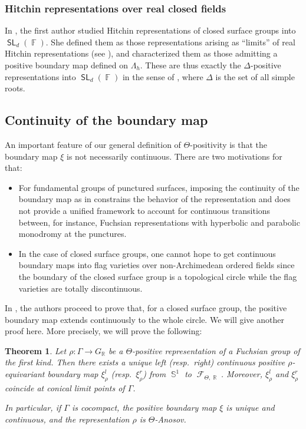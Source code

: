 \documentclass{amsart}
\theoremstyle{plain}
\newtheorem{ThmIntro}{Theorem}
\theoremstyle{definition}
\DeclareMathOperator{\SL}{\mathsf{SL}}
\DeclareMathOperator{\Fc}{\mathcal{F}}
\DeclareMathOperator{\Fb}{{\mathbb{F}}}
\DeclareMathOperator{\Rb}{{\mathbb{R}}}
\DeclareMathOperator{\Sb}{\mathbb{S}}
\newcommand{\1}{\mathbf{1}}
\begin{document}
\subsubsection*{Hitchin representations over real closed fields}
In \cite{Flamm}, the first author studied Hitchin representations of closed surface groups into $\SL_d(\Fb)$. She defined them as those representations arising as ``limits'' of real Hitchin representations (see ), and characterized them as those admitting a positive boundary map defined on $\Lambda_h$.
These are thus exactly the $\Delta$-positive representations into $\SL_d(\Fb)$ in the sense of , where $\Delta$ is the set of all simple roots.

\subsection{Continuity of the boundary map}

An important feature of our general definition of $\Theta$-positivity is that the boundary map $\xi$ is not necessarily continuous. There are two motivations for that:

\begin{itemize}
    \item For fundamental groups of punctured surfaces, imposing the continuity of the boundary map as in \cite{CZZ} constrains the behavior of the representation and does not provide a unified framework to account for continuous transitions between, for instance, Fuchsian representations with hyperbolic and parabolic monodromy at the punctures.

    \item In the case of closed surface groups, one cannot hope to get continuous boundary maps into flag varieties over non-Archimedean ordered fields since the boundary of the closed surface group is a topological circle while the flag varieties are totally discontinuous.
\end{itemize}

In \cite{GLW}, the authors proceed to prove that, for a closed surface group, the positive boundary map extends continuously to the whole circle. We will give another proof here. More precisely, we will prove the following:

\begin{ThmIntro} \label{thm-intro: Continuity boundary map R}
    Let $\rho \colon \Gamma \to G_{\Rb}$ be a $\Theta$-positive representation of a Fuchsian group of the first kind. Then there exists a unique left (resp.\ right) continuous positive $\rho$-equivariant boundary map $\xi_\rho^l$ (resp.\ $\xi_\rho^r$) from $\Sb^1$ to $\Fc_{\Theta,\Rb}$.
    Moreover, $\xi_\rho^l$ and $\xi_\rho^r$ coincide at conical limit points of $\Gamma$.

    In particular, if $\Gamma$ is cocompact, the positive boundary map $\xi$ is unique and continuous, and the representation $\rho$ is $\Theta$-Anosov.
\end{ThmIntro}
\end{document}
